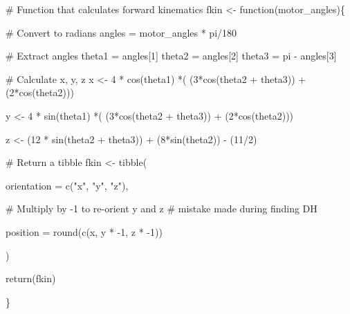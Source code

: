 \documentclass[
  letterpaper,
  DIV=11,
  numbers=noendperiod]{scrreprt}
\newenvironment{Shaded}{\begin{snugshade}}{\end{snugshade}}
\newcommand{\AttributeTok}[1]{\textcolor[rgb]{0.40,0.45,0.13}{#1}}
\newcommand{\CommentTok}[1]{\textcolor[rgb]{0.37,0.37,0.37}{#1}}
\newcommand{\ControlFlowTok}[1]{\textcolor[rgb]{0.00,0.23,0.31}{#1}}
\newcommand{\DecValTok}[1]{\textcolor[rgb]{0.68,0.00,0.00}{#1}}
\newcommand{\FunctionTok}[1]{\textcolor[rgb]{0.28,0.35,0.67}{#1}}
\newcommand{\NormalTok}[1]{\textcolor[rgb]{0.00,0.23,0.31}{#1}}
\newcommand{\OtherTok}[1]{\textcolor[rgb]{0.00,0.23,0.31}{#1}}
\newcommand{\SpecialCharTok}[1]{\textcolor[rgb]{0.37,0.37,0.37}{#1}}
\newcommand{\StringTok}[1]{\textcolor[rgb]{0.13,0.47,0.30}{#1}}
\begin{document}
\begin{Shaded}
\begin{Highlighting}[]
\CommentTok{\# Function that calculates forward kinematics}
\NormalTok{fkin }\OtherTok{\textless{}{-}} \ControlFlowTok{function}\NormalTok{(motor\_angles)\{}
  
  \CommentTok{\# Convert to radians}
\NormalTok{  angles }\OtherTok{=}\NormalTok{ motor\_angles }\SpecialCharTok{*}\NormalTok{ pi}\SpecialCharTok{/}\DecValTok{180}
  
  \CommentTok{\# Extract angles}
\NormalTok{  theta1 }\OtherTok{=}\NormalTok{ angles[}\DecValTok{1}\NormalTok{] }
\NormalTok{  theta2 }\OtherTok{=}\NormalTok{ angles[}\DecValTok{2}\NormalTok{]}
\NormalTok{  theta3 }\OtherTok{=}\NormalTok{ pi }\SpecialCharTok{{-}}\NormalTok{ angles[}\DecValTok{3}\NormalTok{]}
  
  \CommentTok{\# Calculate x, y, z}
\NormalTok{  x }\OtherTok{\textless{}{-}} \DecValTok{4} \SpecialCharTok{*} \FunctionTok{cos}\NormalTok{(theta1) }\SpecialCharTok{*}\NormalTok{( (}\DecValTok{3}\SpecialCharTok{*}\FunctionTok{cos}\NormalTok{(theta2 }\SpecialCharTok{+}\NormalTok{ theta3)) }\SpecialCharTok{+}\NormalTok{ (}\DecValTok{2}\SpecialCharTok{*}\FunctionTok{cos}\NormalTok{(theta2)))}
  
\NormalTok{  y }\OtherTok{\textless{}{-}} \DecValTok{4} \SpecialCharTok{*} \FunctionTok{sin}\NormalTok{(theta1) }\SpecialCharTok{*}\NormalTok{( (}\DecValTok{3}\SpecialCharTok{*}\FunctionTok{cos}\NormalTok{(theta2 }\SpecialCharTok{+}\NormalTok{ theta3)) }\SpecialCharTok{+}\NormalTok{ (}\DecValTok{2}\SpecialCharTok{*}\FunctionTok{cos}\NormalTok{(theta2)))}
  
\NormalTok{  z }\OtherTok{\textless{}{-}}\NormalTok{ (}\DecValTok{12} \SpecialCharTok{*} \FunctionTok{sin}\NormalTok{(theta2 }\SpecialCharTok{+}\NormalTok{ theta3)) }\SpecialCharTok{+}\NormalTok{ (}\DecValTok{8}\SpecialCharTok{*}\FunctionTok{sin}\NormalTok{(theta2)) }\SpecialCharTok{{-}}\NormalTok{ (}\DecValTok{11}\SpecialCharTok{/}\DecValTok{2}\NormalTok{)}
  
  
  \CommentTok{\# Return a tibble}
\NormalTok{  fkin }\OtherTok{\textless{}{-}} \FunctionTok{tibble}\NormalTok{(}
    
    \AttributeTok{orientation =} \FunctionTok{c}\NormalTok{(}\StringTok{"x"}\NormalTok{, }\StringTok{"y"}\NormalTok{, }\StringTok{"z"}\NormalTok{),}
    
    \CommentTok{\# Multiply by {-}1 to re{-}orient y and z}
    \CommentTok{\# mistake made during finding DH}
    
    \AttributeTok{position =} \FunctionTok{round}\NormalTok{(}\FunctionTok{c}\NormalTok{(x, y }\SpecialCharTok{*} \SpecialCharTok{{-}}\DecValTok{1}\NormalTok{, z }\SpecialCharTok{*} \SpecialCharTok{{-}}\DecValTok{1}\NormalTok{))}
    
\NormalTok{  )}
  
  \FunctionTok{return}\NormalTok{(fkin)}
  
  
  

\NormalTok{\}}
\end{Highlighting}
\end{Shaded}
\end{document}
